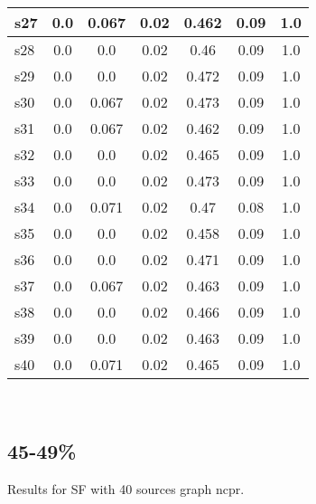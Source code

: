\documentclass{article}
\begin{document}
\begin{tabular}{|l|c|c|c|c|c|c|}
\hline
s27 &0.0 & 0.067 & 0.02 & 0.462 & 0.09 & 1.0\\
\hline
s28 &0.0 & 0.0 & 0.02 & 0.46 & 0.09 & 1.0\\
\hline
s29 &0.0 & 0.0 & 0.02 & 0.472 & 0.09 & 1.0\\
\hline
s30 &0.0 & 0.067 & 0.02 & 0.473 & 0.09 & 1.0\\
\hline
s31 &0.0 & 0.067 & 0.02 & 0.462 & 0.09 & 1.0\\
\hline
s32 &0.0 & 0.0 & 0.02 & 0.465 & 0.09 & 1.0\\
\hline
s33 &0.0 & 0.0 & 0.02 & 0.473 & 0.09 & 1.0\\
\hline
s34 &0.0 & 0.071 & 0.02 & 0.47 & 0.08 & 1.0\\
\hline
s35 &0.0 & 0.0 & 0.02 & 0.458 & 0.09 & 1.0\\
\hline
s36 &0.0 & 0.0 & 0.02 & 0.471 & 0.09 & 1.0\\
\hline
s37 &0.0 & 0.067 & 0.02 & 0.463 & 0.09 & 1.0\\
\hline
s38 &0.0 & 0.0 & 0.02 & 0.466 & 0.09 & 1.0\\
\hline
s39 &0.0 & 0.0 & 0.02 & 0.463 & 0.09 & 1.0\\
\hline
s40 &0.0 & 0.071 & 0.02 & 0.465 & 0.09 & 1.0\\
\hline
\end{tabular}\\

\newpage

\subsection{45-49\%}

\noindent Results for SF with 40 sources graph ncpr.
\end{document}

